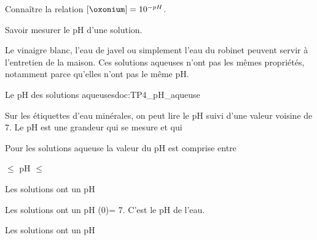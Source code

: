 \tetePremStssChim
\vspace*{-36pt}

\begin{objectifs}
  \item Connaître la relation $[\oxonium] = 10^{-pH}$.
  \item Savoir mesurer le pH d'une solution.
\end{objectifs}


\begin{contexte}
  Le vinaigre blanc, l'eau de javel ou simplement l'eau du robinet peuvent servir à l'entretien de la maison.
  Ces solutions aqueuses n'ont pas les mêmes propriétés, notamment parce qu'elles n'ont pas le même pH.

\end{contexte}


\begin{doc}{Le pH des solutions aqueuses}{doc:TP4_pH_aqueuse}
  \begin{wrapfigure}[3]{r}{0.1\linewidth}
  \end{wrapfigure}
  
  Sur les étiquettes d'eau minérales, on peut lire le pH suivi d'une valeur voisine de 7.
  Le pH est une grandeur qui se mesure et qui 
  
  \begin{importants}
    Pour les solutions aqueuse la valeur du pH est comprise entre
    \begin{center}
       $\leq$ pH $\leq$ 
    \end{center}
  \end{importants}

  \begin{importants}
    \begin{listePoints}
      \item Les solutions  ont un pH 
      \item Les solutions  ont un pH \texteTrou(0){= 7. C'est le pH de l'eau.}
      \item Les solutions  ont un pH 
    \end{listePoints}
  \end{importants}
\end{doc}

